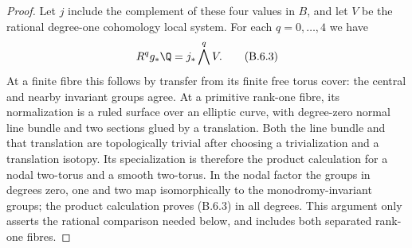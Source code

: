 \begin{proof}
Let $j$ include the complement of these four values in $B$, and let
$V$ be the rational degree-one cohomology local system. For each
$q=0,\ldots,4$ we have
\[
 R^q g_*\Q=j_*\bigwedge^qV.
 \tag{B.6.3}
\]
At a finite fibre this follows by transfer from its finite free torus
cover: the central and nearby invariant groups agree. At a primitive
rank-one fibre, its normalization is a ruled surface over an elliptic
curve, with degree-zero normal line bundle and two sections glued by
a translation. Both the line bundle and that translation are
topologically trivial after choosing a trivialization and a translation
isotopy. Its specialization is therefore the product calculation for
a nodal two-torus and a smooth two-torus. In the nodal factor the
groups in degrees zero, one and two map isomorphically to the
monodromy-invariant groups; the product calculation proves (B.6.3)
in all degrees. This argument only asserts the rational comparison
needed below, and includes both separated rank-one fibres.


\end{proof}
